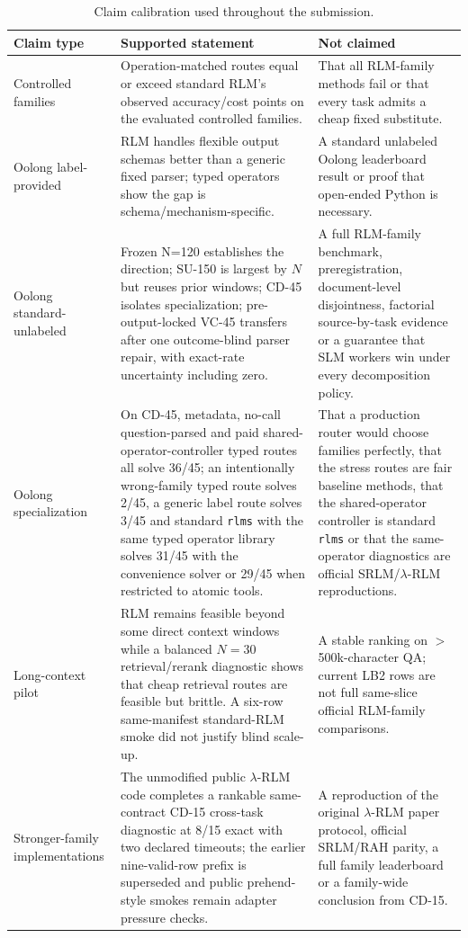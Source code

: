 \documentclass[letterpaper]{article}
\begin{document}
\begin{table}[!t]
\centering
\small
\setlength{\tabcolsep}{3pt}
\begin{tabular}{@{}p{2.7cm}p{5.2cm}p{5.3cm}@{}}
\toprule
\textbf{Claim type} & \textbf{Supported statement} & \textbf{Not claimed} \\
\midrule
Controlled families & Operation-matched routes equal or exceed standard RLM's observed accuracy/cost points on the evaluated controlled families. & That all RLM-family methods fail or that every task admits a cheap fixed substitute. \\
Oolong label-provided & RLM handles flexible output schemas better than a generic fixed parser; typed operators show the gap is schema/mechanism-specific. & A standard unlabeled Oolong leaderboard result or proof that open-ended Python is necessary. \\
Oolong standard-unlabeled & Frozen N=120 establishes the direction; SU-150 is largest by $N$ but reuses prior windows; CD-45 isolates specialization; pre-output-locked VC-45 transfers after one outcome-blind parser repair, with exact-rate uncertainty including zero. & A full RLM-family benchmark, preregistration, document-level disjointness, factorial source-by-task evidence or a guarantee that SLM workers win under every decomposition policy. \\
Oolong specialization & On CD-45, metadata, no-call question-parsed and paid shared-operator-controller typed routes all solve 36/45; an intentionally wrong-family typed route solves 2/45, a generic label route solves 3/45 and standard \texttt{rlms} with the same typed operator library solves 31/45 with the convenience solver or 29/45 when restricted to atomic tools. & That a production router would choose families perfectly, that the stress routes are fair baseline methods, that the shared-operator controller is standard \texttt{rlms} or that the same-operator diagnostics are official SRLM/$\lambda$-RLM reproductions. \\
Long-context pilot & RLM remains feasible beyond some direct context windows while a balanced $N=30$ retrieval/rerank diagnostic shows that cheap retrieval routes are feasible but brittle. A six-row same-manifest standard-RLM smoke did not justify blind scale-up. & A stable ranking on $>$500k-character QA; current LB2 rows are not full same-slice official RLM-family comparisons. \\
Stronger-family implementations & The unmodified public $\lambda$-RLM code completes a rankable same-contract CD-15 cross-task diagnostic at 8/15 exact with two declared timeouts; the earlier nine-valid-row prefix is superseded and public prehend-style smokes remain adapter pressure checks. & A reproduction of the original $\lambda$-RLM paper protocol, official SRLM/RAH parity, a full family leaderboard or a family-wide conclusion from CD-15. \\
\bottomrule
\end{tabular}
\caption{Claim calibration used throughout the submission.}
\label{tab:supp-claim-calibration}
\end{table}
\end{document}

